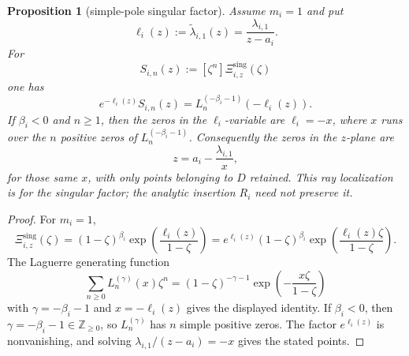 \documentclass[reqno]{article}
\newtheorem{prop}[theorem]{Proposition}
\theoremstyle{definition}
\theoremstyle{remark}
\theoremstyle{plain}
\begin{document}
\begin{prop}[simple-pole singular factor]\label{prop:essential-simple-laguerre}
Assume $m_i=1$ and put
\[
\ell_i(z):=\widetilde\lambda_{i,1}(z)=\frac{\lambda_{i,1}}{z-a_i}.
\]
For
\[
S_{i,n}(z):=[\zeta^n]\Xi^{\mathrm{sing}}_{i,z}(\zeta)
\]
one has
\[
e^{-\ell_i(z)}S_{i,n}(z)=L_n^{(-\beta_i-1)}(-\ell_i(z)).
\]
If $\beta_i<0$ and $n\ge1$, then the zeros in the $\ell_i$-variable are $\ell_i=-x$, where $x$ runs over the $n$ positive zeros of $L_n^{(-\beta_i-1)}$. Consequently the zeros in the $z$-plane are
\[
z=a_i-\frac{\lambda_{i,1}}{x},
\]
for those same $x$, with only points belonging to $D$ retained. This ray localization is for the singular factor; the analytic insertion $R_i$ need not preserve it.
\end{prop}

\begin{proof}
For $m_i=1$,
\[
\Xi^{\mathrm{sing}}_{i,z}(\zeta)=(1-\zeta)^{\beta_i}\exp\!\left(\frac{\ell_i(z)}{1-\zeta}\right)
=e^{\ell_i(z)}(1-\zeta)^{\beta_i}\exp\!\left(\frac{\ell_i(z)\zeta}{1-\zeta}\right).
\]
The Laguerre generating function
\[
\sum_{n\ge0}L_n^{(\gamma)}(x)\zeta^n=(1-\zeta)^{-\gamma-1}\exp\!\left(-\frac{x\zeta}{1-\zeta}\right)
\]
with $\gamma=-\beta_i-1$ and $x=-\ell_i(z)$ gives the displayed identity. If $\beta_i<0$, then $\gamma=-\beta_i-1\in\mathbb Z_{\ge0}$, so $L_n^{(\gamma)}$ has $n$ simple positive zeros. The factor $e^{\ell_i(z)}$ is nonvanishing, and solving $\lambda_{i,1}/(z-a_i)=-x$ gives the stated points.
\end{proof}
\end{document}
